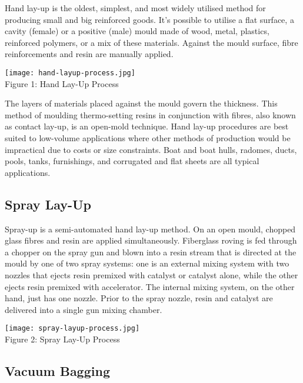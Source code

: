 \documentclass{article}
\begin{document}
\begin{multicols}{2}
Hand lay-up is the oldest, simplest, and most widely utilised method for producing small and big reinforced goods. It's possible to utilise a flat surface, a cavity (female) or a positive (male) mould made of wood, metal, plastics, reinforced polymers, or a mix of these materials. Against the mould surface, fibre reinforcements and resin are manually applied. 

\begin{center}
\texttt{[image: hand-layup-process.jpg]}\\

{\small Figure 1: Hand Lay-Up Process}
\end{center}

The layers of materials placed against the mould govern the thickness. This method of moulding thermo-setting resins in conjunction with fibres, also known as contact lay-up, is an open-mold technique. Hand lay-up procedures are best suited to low-volume applications where other methods of production would be impractical due to costs or size constraints. Boat and boat hulls, radomes, ducts, pools, tanks, furnishings, and corrugated and flat sheets are all typical applications.

\subsection{Spray Lay-Up}

Spray-up is a semi-automated hand lay-up method. On an open mould, chopped glass fibres and resin are applied simultaneously. Fiberglass roving is fed through a chopper on the spray gun and blown into a resin stream that is directed at the mould by one of two spray systems: one is an external mixing system with two nozzles that ejects resin premixed with catalyst or catalyst alone, while the other ejects resin premixed with accelerator. The internal mixing system, on the other hand, just has one nozzle. Prior to the spray nozzle, resin and catalyst are delivered into a single gun mixing chamber.

\begin{center}
\texttt{[image: spray-layup-process.jpg]}\\

{\small Figure 2: Spray Lay-Up Process}
\end{center}

\subsection{Vacuum Bagging}


\end{multicols}
\end{document}
